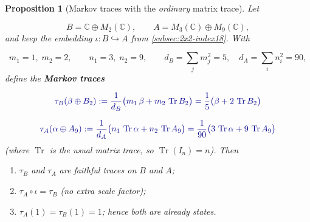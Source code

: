 \documentclass[11pt]{article}
\theoremstyle{mytheoremstyle}
\newtheorem{proposition}[theorem]{\color{MyPurple}Proposition}
\theoremstyle{definition}
\theoremstyle{remark}
\DeclareMathOperator{\Tr}{Tr}
\newcommand{\bbC}{\mathbb{C}}
\begin{document}
\begin{proposition}[{\color{MyPurple}Markov traces with the \emph{ordinary} matrix trace}]
\label{prop:Markov-ordinary}
Let

\[
  B=\bbC\oplus M_{2}(\bbC),
  \qquad
  A=M_{3}(\bbC)\oplus M_{9}(\bbC),
\]
and keep the embedding \(\iota:B\hookrightarrow A\) from
\textsection\ref{subsec:2x2-index18}.  With

\[
  m_1=1,\;m_2=2, \qquad
  n_1=3,\;n_2=9, \qquad
  d_B=\sum_j m_j^{2}=5, \quad
  d_A=\sum_i n_i^{2}=90,
\]
define the \textbf{Markov traces}

\[
 {\color{MyDarkBlue} \tau_B(\beta\oplus B_2)
      :=\frac{1}{d_B}
        \bigl(m_1\,\beta+m_2\,\Tr B_2\bigr)
      =\frac{1}{5}\bigl(\beta+2\,\Tr B_2\bigr) }
\]


\[
 {\color{MyDarkBlue} \tau_A(\alpha\oplus A_9)
      :=\frac{1}{d_A}
        \bigl(n_1\,\Tr\alpha+n_2\,\Tr A_9\bigr)
      =\frac{1}{90}\bigl(3\,\Tr\alpha+9\,\Tr A_9\bigr) }
\]
(where \(\Tr\) is the \emph{usual} matrix trace, so \(\Tr(I_n)=n\)).
Then
\begin{enumerate}[label=\textup{(\roman*)}, leftmargin=2.5em]
  \item\label{it:tracial-ord}
        \(\tau_B\) and \(\tau_A\) are faithful traces on \(B\) and \(A\);
  \item\label{it:compat-ord}
        \(\tau_A\circ\iota=\tau_B\) (no extra scale factor);
  \item\label{it:state-ord}
        \(\tau_A(1)=\tau_B(1)=1\); hence both are already \emph{states}.
\end{enumerate}
\end{proposition}
\end{document}
